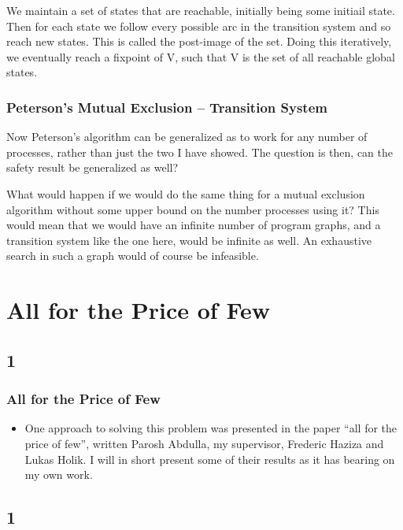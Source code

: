 \documentclass[handout]{beamer}
\begin{document}
\begin{footnotesize}
\begin{frame}
We maintain a set of states that are reachable, initially being some initiail state. Then for each state we follow every possible arc in the transition system and so reach new states. This is called the post-image of the set. Doing this iteratively, we eventually reach a fixpoint of V, such that V is the set of all reachable global states.
\end{frame}

\begin{frame}
  \frametitle{Peterson's Mutual Exclusion -- Transition System}
Now Peterson's algorithm can be generalized as to work for any number of processes, rather than just the two I have showed. The question is then, can the safety result be generalized as well?

What would happen if we would do the same thing for a mutual exclusion algorithm without some upper bound on the number processes using it? This would mean that we would have an infinite number of program graphs, and a transition system like the one here, would be infinite as well. An exhaustive search in such a graph would of course be infeasible.
\end{frame}


\section{All for the Price of Few}
\subsection*{1}
\begin{frame}
  \frametitle{All for the Price of Few}
  \begin{itemize}
\item
One approach to solving this problem was presented in the paper ``all for the price of few'', written Parosh Abdulla, my supervisor, Frederic Haziza and Lukas Holik. I will in short present some of their results as it has bearing on my own work.


  \end{itemize}
\end{frame}

\subsection*{1}

\end{footnotesize}
\end{document}
